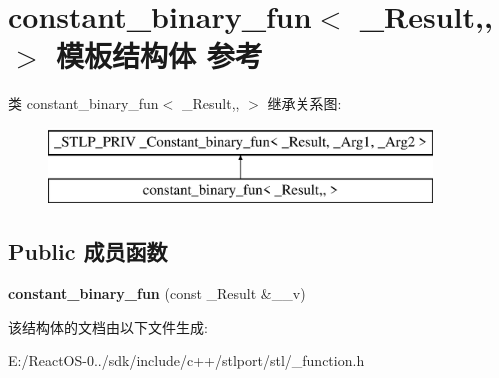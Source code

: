 \hypertarget{structconstant__binary__fun}{}\section{constant\+\_\+binary\+\_\+fun$<$ \+\_\+\+Result,, $>$ 模板结构体 参考}
\label{structconstant__binary__fun}
类 constant\+\_\+binary\+\_\+fun$<$ \+\_\+\+Result,, $>$ 继承关系图\+:\begin{figure}[H]
\begin{center}
\leavevmode
\includegraphics[height=2.000000cm]{structconstant__binary__fun}
\end{center}
\end{figure}
\subsection*{Public 成员函数}
\begin{DoxyCompactItemize}
\item 
\mbox{\label{structconstant__binary__fun_a056ec6d4a61c2055be72b57554569dff}} 
{\bfseries constant\+\_\+binary\+\_\+fun} (const \+\_\+\+Result \&\+\_\+\+\_\+v)
\end{DoxyCompactItemize}


该结构体的文档由以下文件生成\+:\begin{DoxyCompactItemize}
\item 
E\+:/\+React\+O\+S-\/0../sdk/include/c++/stlport/stl/\+\_\+function.\+h\end{DoxyCompactItemize}
